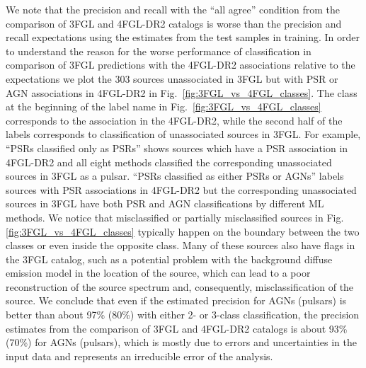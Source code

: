 We note that the precision and recall with the ``all agree'' condition from the comparison of 3FGL and 4FGL-DR2 catalogs is worse than the precision and recall expectations using the estimates from the test samples in training.
In order to understand the reason for the worse performance of classification in comparison of 3FGL predictions with the 4FGL-DR2 associations relative to the expectations we plot the 303 sources unassociated in 3FGL but with PSR or AGN associations in 4FGL-DR2 in 
Fig.~\ref{fig:3FGL_vs_4FGL_classes}.
The class at the beginning of the label name in Fig.~\ref{fig:3FGL_vs_4FGL_classes} corresponds to the association in the 4FGL-DR2, while the second half of the labels corresponds to classification of unassociated sources in 3FGL. For example, ``PSRs classified only as PSRs'' shows sources which have a PSR association in 4FGL-DR2 and all eight methods classified the corresponding unassociated sources in 3FGL as a pulsar. ``PSRs classified as either PSRs or AGNs'' labels sources with PSR associations in 4FGL-DR2 but the corresponding unassociated sources in 3FGL have both PSR and AGN classifications by different ML methods.
We notice that misclassified or partially misclassified sources in Fig. \ref{fig:3FGL_vs_4FGL_classes} typically happen on the boundary between the two classes or even inside the opposite class.
Many of these sources also have flags in the 3FGL catalog, such as a potential problem with the background diffuse emission model in the location of the source, which can lead to a poor reconstruction of the source spectrum and, consequently, misclassification of the source.
We conclude that even if the estimated precision for AGNs (pulsars) is better than about 97\% (80\%) with either 2- or 3-class classification, the precision estimates from the comparison of 3FGL and 4FGL-DR2 catalogs is about 93\% (70\%) for AGNs (pulsars), which is mostly due to errors and uncertainties in the input data and represents an irreducible error of the analysis.

%

